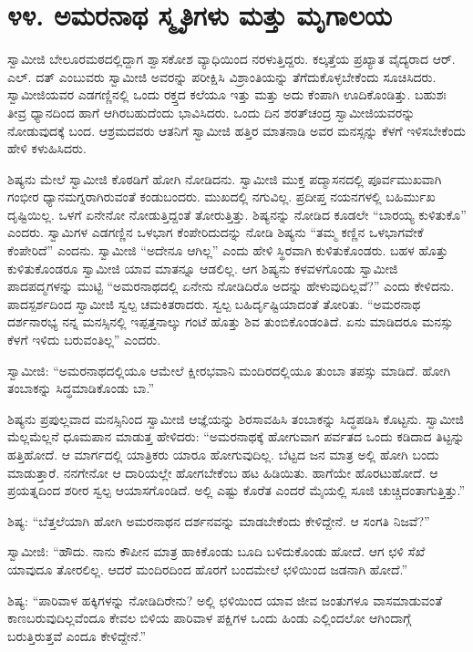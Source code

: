 
\chapter*{೪೪. ಅಮರನಾಥ ಸ್ಮೃತಿಗಳು ಮತ್ತು ಮೃಗಾಲಯ }

 ಸ್ವಾಮೀಜಿ ಬೇಲೂರಮಠದಲ್ಲಿದ್ದಾಗ ಶ್ವಾಸಕೋಶ ವ್ಯಾಧಿಯಿಂದ ನರಳುತ್ತಿದ್ದರು. ಕಲ್ಕತ್ತೆಯ ಪ್ರಖ್ಯಾತ ವೈದ್ಯರಾದ ಆರ್. ಎಲ್. ದತ್ ಎಂಬುವರು ಸ್ವಾಮೀಜಿ ಅವರನ್ನು ಪರೀಕ್ಷಿಸಿ ವಿಶ್ರಾಂತಿಯನ್ನು ತೆಗೆದುಕೊಳ್ಳಬೇಕೆಂದು ಸೂಚಿಸಿದರು. ಸ್ವಾಮೀಜಿಯವರ ಎಡಗಣ್ಣಿನಲ್ಲಿ ಒಂದು ರಕ್ತ್ತದ ಕಲೆಯೂ ಇತ್ತು ಮತ್ತು ಅದು ಕೆಂಪಾಗಿ ಊದಿಕೊಂಡಿತ್ತು. ಬಹುಶಃ ತೀವ್ರ ಧ್ಯಾನದಿಂದ ಹಾಗೆ ಆಗಿರಬಹುದೆಂದು ಭಾವಿಸಿದರು. ಒಂದು ದಿನ ಶರತ್‍ಚಂದ್ರ ಸ್ವಾಮೀಜಿಯವರನ್ನು ನೋಡುವುದಕ್ಕೆ ಬಂದ. ಆಶ್ರಮದವರು ಆತನಿಗೆ ಸ್ವಾಮೀಜಿ ಹತ್ತಿರ ಮಾತನಾಡಿ ಅವರ ಮನಸ್ಸನ್ನು ಕೆಳಗೆ ಇಳಿಸಬೇಕೆಂದು ಹೇಳಿ ಕಳುಹಿಸಿದರು. 

 ಶಿಷ್ಯನು ಮೇಲೆ ಸ್ವಾಮೀಜಿ ಕೊಠಡಿಗೆ ಹೋಗಿ ನೋಡಿದನು. ಸ್ವಾಮೀಜಿ ಮುಕ್ತ ಪದ್ಮಾಸನದಲ್ಲಿ ಪೂರ್ವಮುಖವಾಗಿ ಗಂಭೀರ ಧ್ಯಾನಮಗ್ನರಾಗಿರುವಂತೆ ಕಂಡುಬಂದರು. ಮುಖದಲ್ಲಿ ನಗುವಿಲ್ಲ. ಪ್ರದೀಪ್ತ ನಯನಗಳಲ್ಲಿ ಬಹಿರ್ಮುಖ ದೃಷ್ಟಿಯಿಲ್ಲ. ಒಳಗೆ ಏನೇನೋ ನೋಡುತ್ತಿದ್ದಂತೆ ತೋರುತ್ತಿತ್ತು. ಶಿಷ್ಯನನ್ನು ನೋಡಿದ ಕೂಡಲೇ “ಬಾರಯ್ಯ ಕುಳಿತುಕೊ” ಎಂದರು. ಸ್ವಾಮಿಗಳ ಎಡಗಣ್ಣಿನ ಒಳಭಾಗ ಕೆಂಪೇರಿದುದನ್ನು ನೋಡಿ ಶಿಷ್ಯನು “ತಮ್ಮ ಕಣ್ಣಿನ ಒಳಭಾಗವೇಕೆ ಕೆಂಪೇರಿದೆ” ಎಂದನು. ಸ್ವಾಮೀಜಿ “ಅದೇನೂ ಆಗಿಲ್ಲ” ಎಂದು ಹೇಳಿ ಸ್ಥಿರವಾಗಿ ಕುಳಿತುಕೊಂಡರು. ಬಹಳ ಹೊತ್ತು ಕುಳಿತುಕೊಂಡರೂ ಸ್ವಾಮೀಜಿ ಯಾವ ಮಾತನ್ನೂ ಆಡಲಿಲ್ಲ. ಆಗ ಶಿಷ್ಯನು ಕಳವಳಗೊಂಡು ಸ್ವಾಮೀಜಿ ಪಾದಪದ್ಮಗಳನ್ನು ಮುಟ್ಟಿ “ಅಮರನಾಥದಲ್ಲಿ ಏನೇನು ನೋಡಿದಿರೊ ಅದನ್ನು ಹೇಳುವುದಿಲ್ಲವೆ?” ಎಂದು ಕೇಳಿದನು. ಪಾದಸ್ಪರ್ಶದಿಂದ ಸ್ವಾಮೀಜಿ ಸ್ವಲ್ಪ ಚಮಕಿತರಾದರು. ಸ್ವಲ್ಪ ಬಹಿರ್ದೃಷ್ಟಿಯಾದಂತೆ ತೋರಿತು. “ಅಮರನಾಥ ದರ್ಶನಾರಭ್ಯ ನನ್ನ ಮನಸ್ಸಿನಲ್ಲಿ ಇಪ್ಪತ್ತನಾಲ್ಕು ಗಂಟೆ ಹೊತ್ತು ಶಿವ ತುಂಬಿಕೊಂಡಂತಿದೆ. ಏನು ಮಾಡಿದರೂ ಮನಸ್ಸು ಕೆಳಗೆ ಇಳಿದು ಬರುವಂತಿಲ್ಲ” ಎಂದರು. 

 ಸ್ವಾಮೀಜಿ: “ಅಮರನಾಥದಲ್ಲಿಯೂ ಆಮೇಲೆ ಕ್ಷೀರಭವಾನಿ ಮಂದಿರದಲ್ಲಿಯೂ ತುಂಬಾ ತಪಸ್ಸು ಮಾಡಿದೆ. ಹೋಗಿ ತಂಬಾಕನ್ನು ಸಿದ್ಧಮಾಡಿಕೊಂಡು ಬಾ.” 

 ಶಿಷ್ಯನು ಪ್ರಪುಲ್ಲವಾದ ಮನಸ್ಸಿನಿಂದ ಸ್ವಾಮೀಜಿ ಆಜ್ಞೆಯನ್ನು ಶಿರಸಾವಹಿಸಿ ತಂಬಾಕನ್ನು ಸಿದ್ಧಪಡಿಸಿ ಕೊಟ್ಟನು. ಸ್ವಾಮೀಜಿ ಮೆಲ್ಲಮೆಲ್ಲನೆ ಧೂಮಪಾನ ಮಾಡುತ್ತ ಹೇಳಿದರು: “ಅಮರನಾಥಕ್ಕೆ ಹೋಗುವಾಗ ಪರ್ವತದ ಒಂದು ಕಡಿದಾದ ತಿಟ್ಟನ್ನು ಹತ್ತಿಹೋದೆ. ಆ ಮಾರ್ಗದಲ್ಲಿ ಯಾತ್ರಿಕರು ಯಾರೂ ಹೋಗುವುದಿಲ್ಲ. ಬೆಟ್ಟದ ಜನ ಮಾತ್ರ ಅಲ್ಲಿ ಹೋಗಿ ಬಂದು ಮಾಡುತ್ತಾರೆ. ನನಗೇನೋ ಆ ದಾರಿಯಲ್ಲೇ ಹೋಗಬೇಕೆಂಬ ಹಟ ಹಿಡಿಯಿತು. ಹಾಗೆಯೇ ಹೊರಟುಹೋದೆ. ಆ ಪ್ರಯತ್ನದಿಂದ ಶರೀರ ಸ್ವಲ್ಪ ಆಯಾಸಗೊಂಡಿದೆ. ಅಲ್ಲಿ ಎಷ್ಟು ಕೊರೆತ ಎಂದರೆ ಮೈಯಲ್ಲಿ ಸೂಜಿ ಚುಚ್ಚಿದಂತಾಗುತ್ತಿತ್ತು.” 

 ಶಿಷ್ಯ: “ಬೆತ್ತಲೆಯಾಗಿ ಹೋಗಿ ಅಮರನಾಥನ ದರ್ಶನವನ್ನು ಮಾಡಬೇಕೆಂದು ಕೇಳಿದ್ದೇನೆ. ಆ ಸಂಗತಿ ನಿಜವೆ?” 

 ಸ್ವಾಮೀಜಿ: “ಹೌದು. ನಾನು ಕೌಪೀನ ಮಾತ್ರ ಹಾಕಿಕೊಂಡು ಬೂದಿ ಬಳಿದುಕೊಂಡು ಹೋದೆ. ಆಗ ಛಳಿ ಸೆಖೆ ಯಾವುದೂ ತೋರಲಿಲ್ಲ. ಆದರೆ ಮಂದಿರದಿಂದ ಹೊರಗೆ ಬಂದಮೇಲೆ ಛಳಿಯಿಂದ ಜಡನಾಗಿ ಹೋದೆ.” 

 ಶಿಷ್ಯ: “ಪಾರಿವಾಳ ಹಕ್ಕಿಗಳನ್ನು ನೋಡಿದಿರೇನು? ಅಲ್ಲಿ ಛಳಿಯಿಂದ ಯಾವ ಜೀವ ಜಂತುಗಳೂ ವಾಸಮಾಡುವಂತೆ ಕಾಣಬರುವುದಿಲ್ಲವೆಂದೂ ಕೇವಲ ಬಿಳಿಯ ಪಾರಿವಾಳ ಪಕ್ಷಿಗಳ ಒಂದು ಹಿಂಡು ಎಲ್ಲಿಂದಲೋ ಆಗಿಂದಾಗ್ಗೆ ಬರುತ್ತಿರುತ್ತವೆ ಎಂದೂ ಕೇಳಿದ್ದೇನೆ.” 


